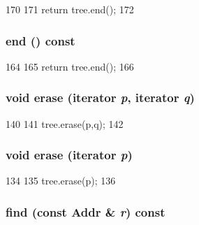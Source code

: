 \begin{DoxyCode}
170     {
171         return tree.end();
172     }
\end{DoxyCode}
\hypertarget{classAddrRangeMap_a350132543d80a1c1e5be844e6d2878ea}{
\subsubsection[{end}]{ end () const}}
\label{classAddrRangeMap_a350132543d80a1c1e5be844e6d2878ea}



\begin{DoxyCode}
164     {
165         return tree.end();
166     }
\end{DoxyCode}
\hypertarget{classAddrRangeMap_a8645d9bde1addc5c75d4076d0f016a98}{
\subsubsection[{erase}]{\setlength{\rightskip}{0pt plus 5cm}void erase ({\bf iterator} {\em p}, \/  {\bf iterator} {\em q})}}
\label{classAddrRangeMap_a8645d9bde1addc5c75d4076d0f016a98}



\begin{DoxyCode}
140     {
141         tree.erase(p,q);
142     }
\end{DoxyCode}
\hypertarget{classAddrRangeMap_a1e39aaf15fad060923b688d4a936624b}{
\subsubsection[{erase}]{\setlength{\rightskip}{0pt plus 5cm}void erase ({\bf iterator} {\em p})}}
\label{classAddrRangeMap_a1e39aaf15fad060923b688d4a936624b}



\begin{DoxyCode}
134     {
135         tree.erase(p);
136     }
\end{DoxyCode}
\hypertarget{classAddrRangeMap_accd4e7ea05da712a71b7e452d64e394f}{
\subsubsection[{find}]{ find (const {\bf Addr} \& {\em r}) const}}
\label{classAddrRangeMap_accd4e7ea05da712a71b7e452d64e394f}



